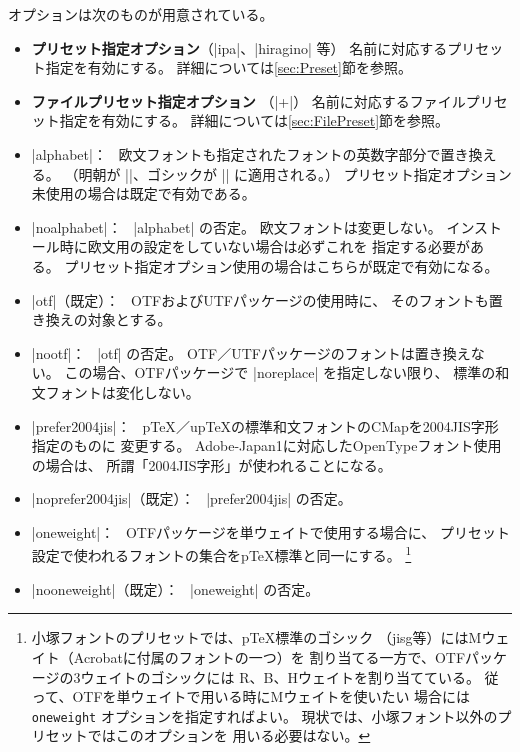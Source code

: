 \documentclass[a4paper,uplatex]{jsarticle}
\newcommand{\Pkg}[1]{\textsf{#1}}
\newcommand{\Means}{：\ }
\providecommand{\pTeX}{p\TeX}
\providecommand{\upTeX}{u\pTeX}
\begin{document}
オプションは次のものが用意されている。

\begin{itemize}
\item \textbf{プリセット指定オプション}（|ipa|、|hiragino| 等）
  名前に対応するプリセット指定を有効にする。
  詳細については\ref{sec:Preset}節を参照。
\item \textbf{ファイルプリセット指定オプション}%
  （|+|\mbox{}）
  名前に対応するファイルプリセット指定を有効にする。
  詳細については\ref{sec:FilePreset}節を参照。
\item |alphabet|\Means
  欧文フォントも指定されたフォントの英数字部分で置き換える。
  （明朝が |\rmfamily|、ゴシックが |\sffamily| に適用される。）
  プリセット指定オプション未使用の場合は既定で有効である。
\item |noalphabet|\Means
  |alphabet| の否定。
  欧文フォントは変更しない。
  インストール時に欧文用の設定をしていない場合は必ずこれを
  指定する必要がある。
  プリセット指定オプション使用の場合はこちらが既定で有効になる。
\item |otf|（既定）\Means
  \Pkg{OTF}および\Pkg{UTF}パッケージの使用時に、
  そのフォントも置き換えの対象とする。
\item |nootf|\Means
  |otf| の否定。
  \Pkg{OTF}／\Pkg{UTF}パッケージのフォントは置き換えない。
  この場合、\Pkg{OTF}パッケージで |noreplace| を指定しない限り、
  標準の和文フォントは変化しない。
\item |prefer2004jis|\Means
  {\pTeX}／{\upTeX}の標準和文フォントのCMapを2004JIS字形指定のものに
  変更する。
  Adobe-Japan1に対応したOpenTypeフォント使用の場合は、
  所謂「2004JIS字形」が使われることになる。
\item |noprefer2004jis|（既定）\Means
  |prefer2004jis| の否定。
\item |oneweight|\Means
  \Pkg{OTF}パッケージを単ウェイトで使用する場合に、
  プリセット設定で使われるフォントの集合を{\pTeX}標準と同一にする。
  \<\footnote{小塚フォントのプリセットでは、{\pTeX}標準のゴシック
  （jisg等）にはMウェイト（Acrobatに付属のフォントの一つ）を
  割り当てる一方で、\Pkg{OTF}パッケージの3ウェイトのゴシックには
  R、B、Hウェイトを割り当てている。
  従って、\Pkg{OTF}を単ウェイトで用いる時にMウェイトを使いたい
  場合には \texttt{oneweight} オプションを指定すればよい。
  現状では、小塚フォント以外のプリセットではこのオプションを
  用いる必要はない。}
\item |nooneweight|（既定）\Means
  |oneweight| の否定。
\end{itemize}
\end{document}
